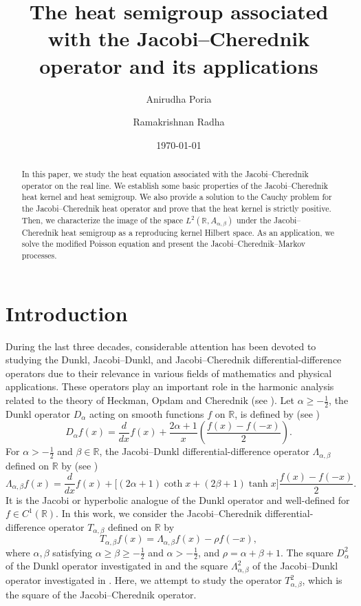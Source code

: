 \documentclass[a4paper,11pt, reqno]{amsart}
\title{The heat semigroup associated with the Jacobi--Cherednik operator and its applications}
\author{Anirudha Poria}
\author{Ramakrishnan Radha}
\date{\today}
\theoremstyle{plain}
\theoremstyle{definition}
\theoremstyle{remark}
\def \R{{\mathbb R}}
\def\R{\mathbb R}
\begin{document}
\maketitle

\begin{abstract} 
In this paper, we study the heat equation associated with the Jacobi--Cherednik operator on the real line. We establish some basic properties of the Jacobi--Cherednik heat kernel and heat semigroup. We also provide a solution to the Cauchy problem for the Jacobi--Cherednik heat operator and prove that the heat kernel is strictly positive. Then, we characterize the image of the space $L^2(\mathbb R, A_{\alpha, \beta})$ under the Jacobi--Cherednik heat semigroup as a reproducing kernel Hilbert space. As an application, we solve the modified Poisson equation and present the Jacobi--Cherednik--Markov processes.
\end{abstract} 


\section{Introduction}  

During the last three decades, considerable attention has been devoted to studying the Dunkl, Jacobi--Dunkl, and Jacobi--Cherednik differential-difference operators due to their relevance in various fields of mathematics and physical applications. These operators play an important role in the harmonic analysis related to the theory of Heckman, Opdam and Cherednik (see \cite{hec91, opd95, opd00}). Let $\alpha \geq -\frac{1}{2}$, the Dunkl operator $D_\alpha$ acting on smooth functions $f$ on $\R$, is defined by (see \cite{dun91})
\[ D_\alpha f(x)= \frac{d}{dx} f(x)+ \frac{2 \alpha+1}{x} \left(  \frac{f(x)-f(-x)}{2} \right). \]
For $\alpha > -\frac{1}{2}$ and $\beta \in \R$, the Jacobi--Dunkl differential-difference operator $\Lambda_{\alpha, \beta}$ defined on $\R$ by (see \cite{hec91, opd95})
\[ \Lambda_{\alpha, \beta} f(x) = \frac{d}{dx} f(x)+ \Big[  (2\alpha + 1) \coth x + (2\beta + 1) \tanh x \Big] \frac{f(x)-f(-x)}{2} . \]
It is the Jacobi or hyperbolic analogue of the Dunkl operator and well-defined for $f \in C^1(\R)$. In this work, we consider the Jacobi--Cherednik differential-difference operator $T_{\alpha, \beta}$ defined on $\R$ by 
\[ T_{\alpha, \beta} f(x)=  \Lambda_{\alpha, \beta} f(x) - \rho f(-x), \]
where $\alpha, \beta$ satisfying $\alpha \geq \beta \geq -\frac{1}{2}$ and $\alpha > -\frac{1}{2}$, and $\rho= \alpha + \beta + 1$. The square $D^2_\alpha$ of the Dunkl operator investigated in \cite{ros98} and the square $\Lambda^2_{\alpha, \beta}$ of the Jacobi--Dunkl operator investigated in \cite{chou06}. Here, we attempt to study the operator $T^2_{\alpha, \beta}$, which is the square of the Jacobi--Cherednik operator.
\end{document}

